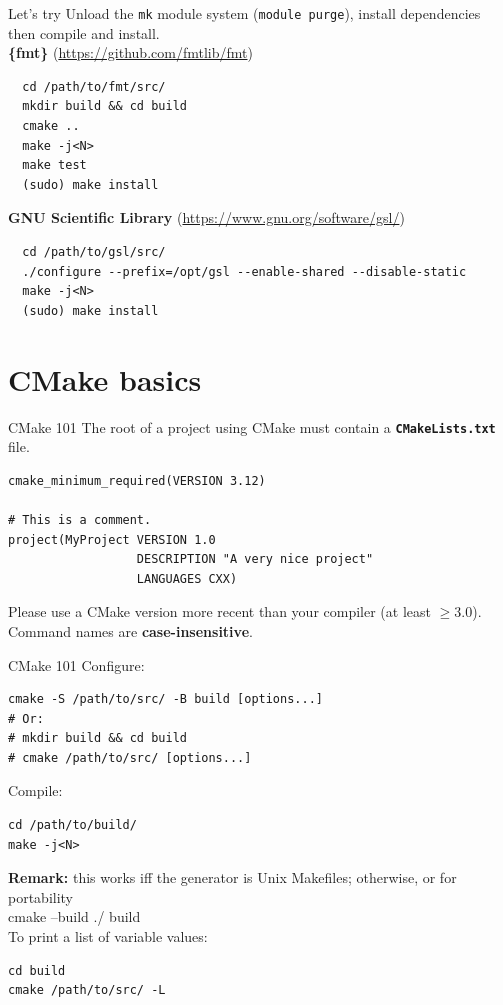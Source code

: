 \documentclass[aspectratio=169,11pt]{beamer}
\begin{document}
\begin{frame}[fragile]{Let's try}
  Unload the \texttt{mk} module system (\texttt{module purge}), install dependencies then compile and install.\\
  \textbf{\{fmt\}} {\small (\url{https://github.com/fmtlib/fmt})}
  \begin{verbatim}
  cd /path/to/fmt/src/
  mkdir build && cd build
  cmake ..
  make -j<N>
  make test
  (sudo) make install
  \end{verbatim}
{ \color{gray} {
  \textbf{GNU Scientific Library} {\small (\url{https://www.gnu.org/software/gsl/})}
  \begin{verbatim}
  cd /path/to/gsl/src/
  ./configure --prefix=/opt/gsl --enable-shared --disable-static
  make -j<N>
  (sudo) make install
  \end{verbatim}
}}
\end{frame}

\section{CMake basics}
\begin{frame}[fragile]{CMake 101}
The root of a project using CMake must contain a \textbf{\texttt{CMakeLists.txt}} file.

\begin{verbatim}
cmake_minimum_required(VERSION 3.12)

# This is a comment.
project(MyProject VERSION 1.0
                  DESCRIPTION "A very nice project"
                  LANGUAGES CXX)
\end{verbatim}
Please use a CMake version more recent than your compiler (at least \(\geq 3.0\)).
\vfill
Command names are \textbf{case-insensitive}.
\end{frame}

\begin{frame}[fragile]{CMake 101}
Configure:
\begin{verbatim}
cmake -S /path/to/src/ -B build [options...]
# Or:
# mkdir build && cd build
# cmake /path/to/src/ [options...]
\end{verbatim}
Compile:
\begin{verbatim}
cd /path/to/build/
make -j<N>
\end{verbatim}
\vspace{-3mm}
\textbf{Remark:} this works iff the generator is Unix Makefiles; otherwise, or for portability\\ {\ttfamily cmake --build ./ build}\\
\vspace{3mm}
To print a list of variable values:
\begin{verbatim}
cd build
cmake /path/to/src/ -L
\end{verbatim}
\end{frame}
\end{document}
